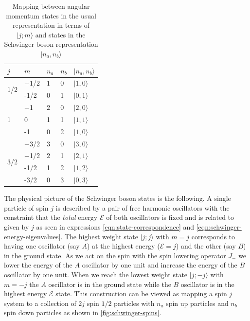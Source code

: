 \documentclass[twocolumn,draft,aps,nofootinbib,nobibnotes,final]{revtex4-2}
\newcommand{\mc}[1]{\mathcal{#1}}
\newcommand{\ket}[1]{\vert #1 \rangle}
\begin{document}
\begin{table}[]
	\begin{tabular}{|l|l|l|l|l|}
		\hline
		$ j $                    & $ m $    & $ n_a $ & $ n_b $ & $ \ket{n_a, n_b} $ \\ \hline
		\multirow{2}{*}{1/2} & +1/2 & 1   & 0   & $ \ket{1,0} $              \\ \cline{2-5} 
		& -1/2 & 0   & 1   & $ \ket{0,1} $              \\ \hline
		\multirow{3}{*}{1}   & +1   & 2   & 0   & $ \ket{2,0} $              \\ \cline{2-5} 
		& 0    & 1   & 1   & $ \ket{1,1} $              \\ \cline{2-5} 
		& -1   & 0   & 2   & $ \ket{1,0} $              \\ \hline
		\multirow{4}{*}{3/2} & +3/2 & 3   & 0   & $ \ket{3,0} $              \\ \cline{2-5} 
		& +1/2 & 2   & 1   & $ \ket{2,1} $              \\ \cline{2-5} 
		& -1/2 & 1   & 2   & $ \ket{1,2} $              \\ \cline{2-5} 
		& -3/2 & 0   & 3   & $ \ket{0,3} $              \\ \hline
	\end{tabular}
	\caption{Mapping between angular momentum states in the usual representation in terms of $ \ket{j;m} $ and states in the Schwinger boson representation $ \ket{n_a, n_b} $}
	\label{tbl:schwinger-boson-map}
\end{table}

The physical picture of the Schwinger boson states is the following. A single particle of spin $ j $ is described by a pair of free harmonic oscillators with the constraint that the \textit{total} energy $ \mc E $ of both oscillators is fixed and is related to given by $ j $ as seen in expressions \eqref{eqn:state-correspondence} and \eqref{eqn:schwinger-energy-eigenvalues}. The highest weight state $ \ket{j;j} $ with $ m = j $ corresponds to having one oscillator (say $ A $) at the highest energy ($ \mc E = j $) and the other (say $ B $) in the ground state. As we act on the spin with the spin lowering operator $ J_- $ we lower the energy of the $ A $ oscillator by one unit and increase the energy of the $ B $ oscillator by one unit. When we reach the lowest weight state $ \ket{j;-j} $ with $ m = -j $ the $ A $ oscillator is in the ground state while the $ B $ oscillator is in the highest energy $ \mc E $ state. This construction can be viewed as mapping a spin $ j $ system to a collection of $ 2j $ spin $ 1/2 $ particles with $ n_a $ spin up particles and $ n_b $ spin down particles as shown in \autoref{fig:schwinger-spins}.
\end{document}
